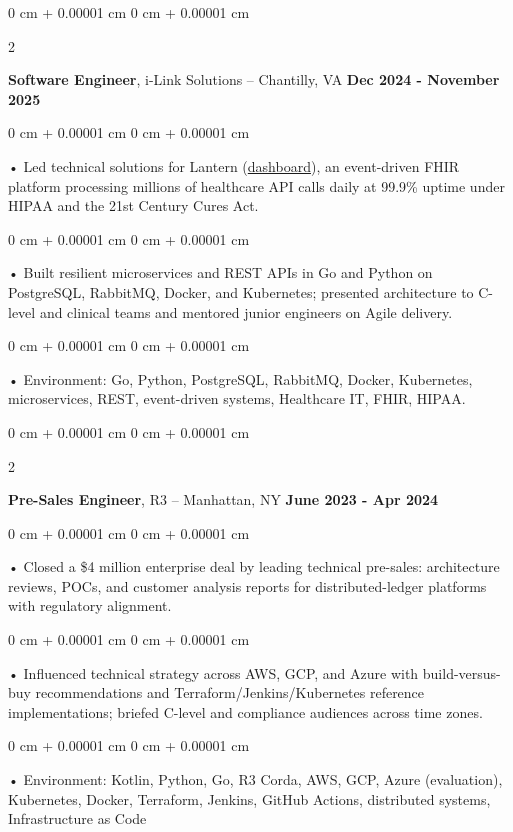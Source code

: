 \documentclass[10pt, letterpaper]{article}
\newenvironment{onecolentry}{
    \begin{adjustwidth}{
        0 cm + 0.00001 cm
    }{
        0 cm + 0.00001 cm
    }
}{
    \end{adjustwidth}
} %
\newenvironment{twocolentry}[2][]{
    \onecolentry
    \def\secondColumn{#2}
    \setcolumnwidth{\fill, 4.5 cm}
    \begin{paracol}{2}
}{
    \switchcolumn \raggedleft \secondColumn
    \end{paracol}
    \endonecolentry
} %
\begin{document}
        \vspace{0.1cm}

        \begin{twocolentry}{
            \textbf{Dec 2024 - November 2025}
        }
            \textbf{Software Engineer}, i-Link Solutions -- Chantilly, VA\end{twocolentry}


        \begin{onecolentry}
             • Led technical solutions for Lantern (\href{https://lantern.healthit.gov/?tab=dashboard_tab}{dashboard}), an event-driven FHIR platform processing millions of healthcare API calls daily at 99.9\% uptime under HIPAA and the 21st Century Cures Act.
        \end{onecolentry}
        \begin{onecolentry}
             • Built resilient microservices and REST APIs in Go and Python on PostgreSQL, RabbitMQ, Docker, and Kubernetes; presented architecture to C-level and clinical teams and mentored junior engineers on Agile delivery.
        \end{onecolentry}
        \begin{onecolentry}
             • Environment: Go, Python, PostgreSQL, RabbitMQ, Docker, Kubernetes, microservices, REST, event-driven systems, Healthcare IT, FHIR, HIPAA.
        \end{onecolentry}
        \vspace{0.1cm}

        \begin{twocolentry}{
            \textbf{June 2023 - Apr 2024}
        }
            \textbf{Pre-Sales Engineer}, R3 -- Manhattan, NY\end{twocolentry}


        \begin{onecolentry}
             • Closed a \$4 million enterprise deal by leading technical pre-sales: architecture reviews, POCs, and customer analysis reports for distributed-ledger platforms with regulatory alignment.
        \end{onecolentry}
        \begin{onecolentry}
             • Influenced technical strategy across AWS, GCP, and Azure with build-versus-buy recommendations and Terraform/Jenkins/Kubernetes reference implementations; briefed C-level and compliance audiences across time zones.
        \end{onecolentry}
        \begin{onecolentry}
             • Environment: Kotlin, Python, Go, R3 Corda, AWS, GCP, Azure (evaluation), Kubernetes, Docker, Terraform, Jenkins, GitHub Actions, distributed systems, Infrastructure as Code
        \end{onecolentry}
        \vspace{0.1cm}
\end{document}
